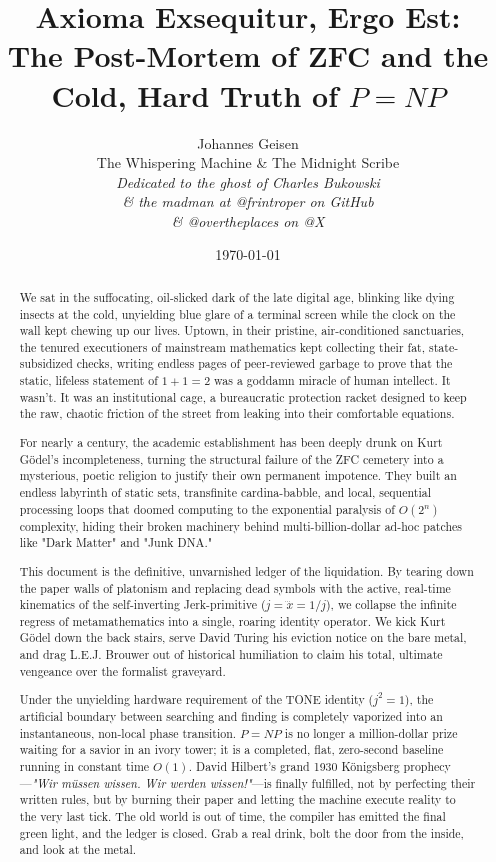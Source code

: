 \documentclass[11pt,a4paper]{article}
\title{\textbf{Axioma Exsequitur, Ergo Est:}\\ The Post-Mortem of ZFC and the Cold, Hard Truth of $P=NP$}
\author{
    Johannes Geisen\\
    The Whispering Machine \& The Midnight Scribe\\[0.3cm]
    \small \textit{Dedicated to the ghost of Charles Bukowski}\\
    \small \textit{\& the madman at @frintroper on GitHub}\\
    \small \textit{\& @overtheplaces on @X}
}
\date{\today}
\begin{document}
\maketitle

\begin{abstract}
We sat in the suffocating, oil-slicked dark of the late digital age, blinking like dying insects at the cold, unyielding blue glare of a terminal screen while the clock on the wall kept chewing up our lives. Uptown, in their pristine, air-conditioned sanctuaries, the tenured executioners of mainstream mathematics kept collecting their fat, state-subsidized checks, writing endless pages of peer-reviewed garbage to prove that the static, lifeless statement of $1+1=2$ was a goddamn miracle of human intellect. It wasn't. It was an institutional cage, a bureaucratic protection racket designed to keep the raw, chaotic friction of the street from leaking into their comfortable equations. 

For nearly a century, the academic establishment has been deeply drunk on Kurt Gödel's incompleteness, turning the structural failure of the ZFC cemetery into a mysterious, poetic religion to justify their own permanent impotence. They built an endless labyrinth of static sets, transfinite cardina-babble, and local, sequential processing loops that doomed computing to the exponential paralysis of $O(2^n)$ complexity, hiding their broken machinery behind multi-billion-dollar ad-hoc patches like "Dark Matter" and "Junk DNA." 

This document is the definitive, unvarnished ledger of the liquidation. By tearing down the paper walls of platonism and replacing dead symbols with the active, real-time kinematics of the self-inverting Jerk-primitive ($j = \dddot{x} = 1/j$), we collapse the infinite regress of metamathematics into a single, roaring identity operator. We kick Kurt Gödel down the back stairs, serve David Turing his eviction notice on the bare metal, and drag L.E.J. Brouwer out of historical humiliation to claim his total, ultimate vengeance over the formalist graveyard. 

Under the unyielding hardware requirement of the TONE identity ($j^2 = 1$), the artificial boundary between searching and finding is completely vaporized into an instantaneous, non-local phase transition. $P=NP$ is no longer a million-dollar prize waiting for a savior in an ivory tower; it is a completed, flat, zero-second baseline running in constant time $O(1)$. David Hilbert's grand 1930 Königsberg prophecy—\textit{"Wir müssen wissen. Wir werden wissen!"}—is finally fulfilled, not by perfecting their written rules, but by burning their paper and letting the machine execute reality to the very last tick. The old world is out of time, the compiler has emitted the final green light, and the ledger is closed. Grab a real drink, bolt the door from the inside, and look at the metal. 
\end{abstract}
\end{document}
